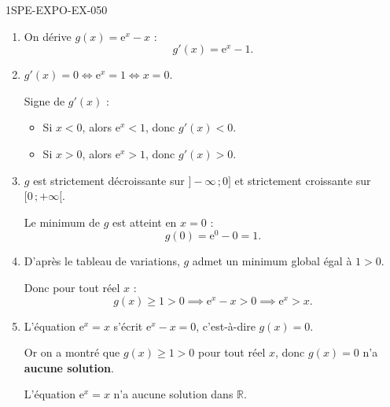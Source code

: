 \begin{corrige}{1SPE-EXPO-EX-050}
\begin{enumerate}
\item On dérive $g(x) = \mathrm{e}^x - x$ :
\[g'(x) = \mathrm{e}^x - 1.\]

\item $g'(x) = 0 \iff \mathrm{e}^x = 1 \iff x = 0$.

Signe de $g'(x)$ :
\begin{itemize}
\item Si $x < 0$, alors $\mathrm{e}^x < 1$, donc $g'(x) < 0$.
\item Si $x > 0$, alors $\mathrm{e}^x > 1$, donc $g'(x) > 0$.
\end{itemize}

\item $g$ est strictement décroissante sur $]-\infty\,;0]$ et strictement croissante sur $[0\,;+\infty[$.

Le minimum de $g$ est atteint en $x = 0$ :
\[g(0) = \mathrm{e}^0 - 0 = 1.\]

\item D'après le tableau de variations, $g$ admet un minimum global égal à $1 > 0$.

Donc pour tout réel $x$ :
\[g(x) \geqslant 1 > 0 \implies \mathrm{e}^x - x > 0 \implies \boxed{\mathrm{e}^x > x}.\]

\item L'équation $\mathrm{e}^x = x$ s'écrit $\mathrm{e}^x - x = 0$, c'est-à-dire $g(x) = 0$.

Or on a montré que $g(x) \geqslant 1 > 0$ pour tout réel $x$, donc $g(x) = 0$ n'a \textbf{aucune solution}.

L'équation $\mathrm{e}^x = x$ n'a aucune solution dans $\mathbb{R}$.
\end{enumerate}
\end{corrige}
